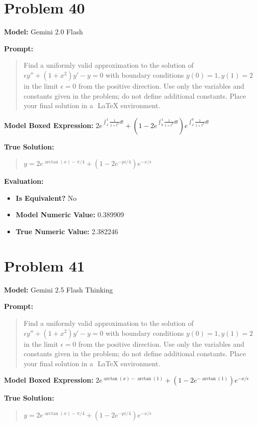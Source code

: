 \documentclass{article}
\begin{document}
\section*{Problem 40}
\textbf{Model:} Gemini 2.0 Flash

\textbf{Prompt:}
\begin{quote}
Find a uniformly valid approximation to the solution of $\epsilon y'' + (1 + x^2) y' - y = 0$ with boundary conditions $y(0) = 1, y(1) = 2$ in the limit $\epsilon = 0$ from the positive direction. Use only the variables and constants given in the problem; do not define additional constants. Place your final solution in a $\boxed{}$ LaTeX environment.
\end{quote}
\textbf{Model Boxed Expression:} $2e^{\int_x^1 \frac{1}{1+t^2} dt} + \left(1 - 2e^{\int_0^1 \frac{1}{1+t^2} dt}\right)e^{\int_x^0 \frac{1}{1+t^2} dt}$

\textbf{True Solution:}
\begin{quote}
$y = 2 e^{\arctan(x) - \pi/4} + (1 - 2 e^{-pi/4}) e^{-x/\epsilon}$
\end{quote}

\textbf{Evaluation:}
\begin{itemize}
\item \textbf{Is Equivalent?} No
\item \textbf{Model Numeric Value:} 0.389909
\item \textbf{True Numeric Value:} 2.382246
\end{itemize}
\vspace{1cm}
\section*{Problem 41}
\textbf{Model:} Gemini 2.5 Flash Thinking

\textbf{Prompt:}
\begin{quote}
Find a uniformly valid approximation to the solution of $\epsilon y'' + (1 + x^2) y' - y = 0$ with boundary conditions $y(0) = 1, y(1) = 2$ in the limit $\epsilon = 0$ from the positive direction. Use only the variables and constants given in the problem; do not define additional constants. Place your final solution in a $\boxed{}$ LaTeX environment.
\end{quote}
\textbf{Model Boxed Expression:} $2 e^{\arctan(x) - \arctan(1)} + (1 - 2 e^{-\arctan(1)}) e^{-x/\epsilon}$

\textbf{True Solution:}
\begin{quote}
$y = 2 e^{\arctan(x) - \pi/4} + (1 - 2 e^{-pi/4}) e^{-x/\epsilon}$
\end{quote}
\end{document}
